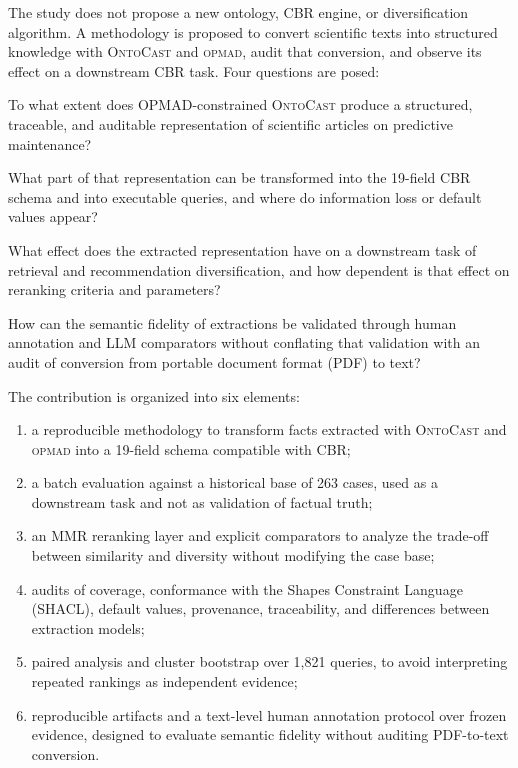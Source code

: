 \documentclass[journal]{IEEEtran}
\newcommand{\OPMAD}{\textsc{opmad}}
\newcommand{\OntoCast}{\textsc{OntoCast}}
\begin{document}
The study does not propose a new ontology, CBR engine, or diversification algorithm. A methodology is proposed to convert scientific texts into structured knowledge with \OntoCast{} and \OPMAD{}, audit that conversion, and observe its effect on a downstream CBR task. Four questions are posed:

\begin{description}[style=nextline,leftmargin=1.5cm,labelwidth=1.2cm]
  \item[Q1.] To what extent does OPMAD-constrained \OntoCast{} produce a structured, traceable, and auditable representation of scientific articles on predictive maintenance?
  \item[Q2.] What part of that representation can be transformed into the 19-field CBR schema and into executable queries, and where do information loss or default values appear?
  \item[Q3.] What effect does the extracted representation have on a downstream task of retrieval and recommendation diversification, and how dependent is that effect on reranking criteria and parameters?
  \item[Q4.] How can the semantic fidelity of extractions be validated through human annotation and LLM comparators without conflating that validation with an audit of conversion from portable document format (PDF) to text?
\end{description}

The contribution is organized into six elements:

\begin{enumerate}[label=(\roman*)]
  \item a reproducible methodology to transform facts extracted with \OntoCast{} and \OPMAD{} into a 19-field schema compatible with CBR;
  \item a batch evaluation against a historical base of 263 cases, used as a downstream task and not as validation of factual truth;
  \item an MMR reranking layer and explicit comparators to analyze the trade-off between similarity and diversity without modifying the case base;
  \item audits of coverage, conformance with the Shapes Constraint Language (SHACL), default values, provenance, traceability, and differences between extraction models;
  \item paired analysis and cluster bootstrap over 1,821 queries, to avoid interpreting repeated rankings as independent evidence;
  \item reproducible artifacts and a text-level human annotation protocol over frozen evidence, designed to evaluate semantic fidelity without auditing PDF-to-text conversion.
\end{enumerate}
\end{document}

